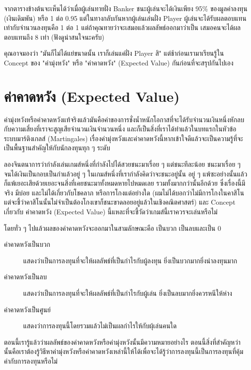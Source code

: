 \documentclass[12pt]{article}
\begin{document}
จากตารางข้างต้นจะเห็นได้ว่าเมื่อผู้เล่นทายฝั่ง Banker ชนะผู้เล่นจะได้เงินเพียง 95\% ของมูลค่าลงทุน (เงินเดิมพัน) หรือ 1 ต่อ 0.95 แต่ในทางกลับกันหากผู้เล่นเล่นฝั่ง Player ผู้เล่นจะได้รับผลตอบแทนเท่ากับจำนวนลงทุนคือ 1 ต่อ 1 แต่ถ้าคุณทายว่าจะเสมอแล้วผลลัพธ์ออกมาว่าเป็น เสมอคนจะได้ผลตอบแทนถึง 8 เท่า (ฟังดูน่าสนใจนะครับ)

คุณอาจมองว่า "มันก็ไม่ได้แย่ขนาดนั้น เราก็เล่นแค่ฝั่ง Player สิ" แต่ช้าก่อนเรามาเรียนรู้ใน Concept ของ "ค่ามุ่งหวัง" หรือ "ค่าคาดหวัง" (Expected Value) กันก่อนที่จะสรุปกันไปเอง

\newpage
\section{ค่าคาดหวัง (Expected Value)}

ค่ามุ่งหวังหรือค่าคาดหวังแท้จริงแล้วมันคือค่าของการชั่งน้ำหนักโอกาสที่จะได้รับจำนวนเงินหนึ่งหักลบกับความเสี่ยงที่เราจะสูญเสียจำนวนเงินจำนวนหนึ่ง และก็เป็นสิ่งที่เราได้ทำแล้วในบทแรกในหัวข้อระบบมาร์ติงเกลส์ (Martingales) เรื่องค่ามุ่งหวังและค่าคาดหวังนี้หากเข้าใจดีแล้วจะเป็นความรู้ที่จะเป็นพื้นฐานสำคัญให้กับนักลงทุนทุก ๆ ระดับ

ลองจินตนาการว่ากำลังเล่นเกมส์หนึ่งที่กำลังไปได้สวยชนะมาเรื่อย ๆ แต่ชนะทีละน้อย ชนะมาเรื่อย ๆ จนได้เงินเป็นกอบเป็นกำแล้วอยู่ ๆ ในเกมส์หนึ่งที่เรากำลังคิดว่าจะชนะอยู่นั้น อยู่ ๆ แพ้ซะอย่างนั้นแล้วก็แพ้เยอะเสียด้วยเยอะจนสิ่งที่เคยชนะมาทั้งหมดหายไปหมดเลย รวมทั้งมากกว่านั้นอีกด้วย ซึ่งเรื่องนี้มีจริง มีบ่อย และไม่ได้เกี่ยวกับโชคลาภ หรือการโกงแต่อย่างใด (ผมไม่ได้บอกว่าไม่มีการโกงในคาสิโน แต่จะชี้ว่าคาสิโนนั้นไม่จำเป็นต้องโกงเขาก็ชนะขาดลอยอยู่แล้วในเชิงคณิตศาสตร์) และ Concept เกี่ยวกับ ค่าคาดหวัง (Expected Value) นี้แหละที่จะชี้วัดว่าเกมส์นี้เราควรจะเล่นหรือไม่

โดยทั่ว ๆ ไปแล้วผลของค่าคาดหวังจะออกมาในสามลักษณะคือ เป็นบวก เป็นลบและเป็น 0

\begin{description}
\item[ค่าคาดหวังเป็นบวก] แสดงว่าเป็นการลงทุนที่จะให้ผลลัพธ์ที่เป็นกำไรกับผู้ลงทุน ยิ่งเป็นบวกมากยิ่งน่าลงทุนมาก
\item[ค่าคาดหวังเป็นลบ] แสดงว่าเป็นการลงทุนที่จะให้ผลลัพธ์ที่เป็นกำไรกับผู้เล่น ยิ่งเป็นลบมากยิ่งควรหนีให้ห่าง
\item[ค่าคาดหวังเป็นศูนย์]  แสดงว่าการลงทุนนี้โดยรวมแล้วไม่เป็นผลกำไรให้กับผุ้เล่นคนใด
\end{description}

ตอนนี้เรารู้แล้วว่าผลลัพธ์ของค่าคาดหวังหรือค่ามุ่งหวังนั้นมีความหมายอย่างไร ตอนนี้สิ่งที่สำคัญหว่านั้นคือเราต้องรู้วิธีหาค่ามุ่งหวังหรือค่าคาดหวังเหล่านี้ให้ได้เพื่อจะได้รู้ว่าการลงทุนนี้เป็นการลงทุนที่คุ้มค่ากับการลงทุนหรือไม่ 
\end{document}
